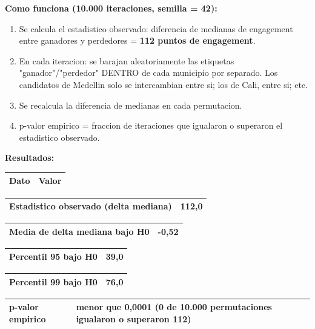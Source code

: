 \documentclass[11pt,a4paper]{article}
\begin{document}
\textbf{Como funciona (10.000 iteraciones, semilla = 42):}\\[2pt]

\begin{enumerate}[noitemsep,topsep=2pt]
\item Se calcula el estadistico observado: diferencia de medianas de engagement entre ganadores y perdedores = \textbf{112 puntos de engagement}.
\item En cada iteracion: se barajan aleatoriamente las etiquetas "ganador"/"perdedor" DENTRO de cada municipio por separado. Los candidatos de Medellin solo se intercambian entre si; los de Cali, entre si; etc.
\item Se recalcula la diferencia de medianas en cada permutacion.
\item p-valor empirico = fraccion de iteraciones que igualaron o superaron el estadistico observado.
\end{enumerate}

\textbf{Resultados:}\\[2pt]

\begin{center}
\begin{tabular}{ll}
\hline
Dato & Valor \\
\hline
\end{tabular}
\end{center}
\begin{center}
\begin{tabular}{ll}
\hline
Estadistico observado (delta mediana) & 112,0 \\
\hline
\end{tabular}
\end{center}
\begin{center}
\begin{tabular}{ll}
\hline
Media de delta mediana bajo H0 & -0,52 \\
\hline
\end{tabular}
\end{center}
\begin{center}
\begin{tabular}{ll}
\hline
Percentil 95 bajo H0 & 39,0 \\
\hline
\end{tabular}
\end{center}
\begin{center}
\begin{tabular}{ll}
\hline
Percentil 99 bajo H0 & 76,0 \\
\hline
\end{tabular}
\end{center}
\begin{center}
\begin{tabular}{ll}
\hline
\textbf{p-valor empirico} & \textbf{menor que 0,0001} (0 de 10.000 permutaciones igualaron o superaron 112) \\
\hline
\end{tabular}
\end{center}
\end{document}
